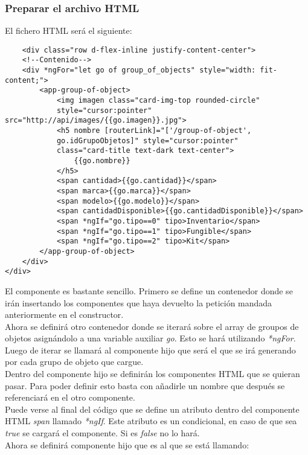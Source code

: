 \subsubsection{Preparar el archivo HTML}
El fichero HTML será el siguiente:
\begin{verbatim}
    <div class="row d-flex-inline justify-content-center">
    <!--Contenido-->
    <div *ngFor="let go of group_of_objects" style="width: fit-content;">
        <app-group-of-object>
            <img imagen class="card-img-top rounded-circle" 
            style="cursor:pointer" src="http://api/images/{{go.imagen}}.jpg">
            <h5 nombre [routerLink]="['/group-of-object', 
            go.idGrupoObjetos]" style="cursor:pointer"
            class="card-title text-dark text-center">
                {{go.nombre}}
            </h5>
            <span cantidad>{{go.cantidad}}</span>
            <span marca>{{go.marca}}</span>
            <span modelo>{{go.modelo}}</span>
            <span cantidadDisponible>{{go.cantidadDisponible}}</span>
            <span *ngIf="go.tipo==0" tipo>Inventario</span>
            <span *ngIf="go.tipo==1" tipo>Fungible</span>
            <span *ngIf="go.tipo==2" tipo>Kit</span>
        </app-group-of-object>
    </div>
</div>
\end{verbatim}
El componente es bastante sencillo. Primero se define un contenedor donde se irán insertando los componentes que haya devuelto la petición mandada anteriormente en el constructor.
\\Ahora se definirá otro contenedor donde se iterará sobre el array de groupos de objetos asignándolo a una variable auxiliar \textit{go}. Esto se hará utilizando \textit{*ngFor}.
\\Luego de iterar se llamará al componente hijo que será el que se irá generando por cada grupo de objeto que cargue.
\\Dentro del componente hijo se definirán los componentes HTML que se quieran pasar. Para poder definir esto basta con añadirle un nombre que después se referenciará en el otro componente.
\\Puede verse al final del código que se define un atributo dentro del componente HTML \textit{span} llamado \textit{*ngIf}. Este atributo es un condicional, en caso de que sea \textit{true} se cargará el componente. Si es \textit{false} no lo hará.
\\Ahora se definirá componente hijo que es al que se está llamando:

